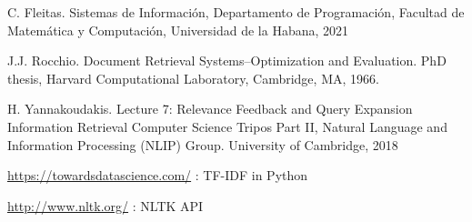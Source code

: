 \documentclass[runningheads,a4paper]{llncs}
\begin{document}
\begin{thebibliography}{4}

 C. Fleitas. Sistemas de Información, Departamento de Programación, Facultad de Matemática y Computación, Universidad de la Habana, 2021

 J.J. Rocchio. Document Retrieval Systems–Optimization and Evaluation.
PhD thesis, Harvard Computational Laboratory, Cambridge, MA, 1966.

 H. Yannakoudakis. Lecture 7: Relevance Feedback and Query
Expansion Information Retrieval Computer Science Tripos Part II, Natural Language and Information Processing (NLIP) Group. University of Cambridge, 2018 

 \url{https://towardsdatascience.com/} : TF-IDF in Python

 \url{http://www.nltk.org/} : NLTK API

\end{thebibliography}
\end{document}
